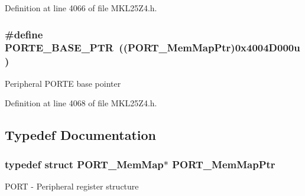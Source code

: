 Definition at line 4066 of file M\+K\+L25\+Z4.\+h.

\subsubsection[{\texorpdfstring{P\+O\+R\+T\+E\+\_\+\+B\+A\+S\+E\+\_\+\+P\+TR}{PORTE_BASE_PTR}}]{\setlength{\rightskip}{0pt plus 5cm}\#define P\+O\+R\+T\+E\+\_\+\+B\+A\+S\+E\+\_\+\+P\+TR~(({\bf P\+O\+R\+T\+\_\+\+Mem\+Map\+Ptr})0x4004\+D000u)}\hypertarget{group___p_o_r_t___peripheral_gab166fe285bbb15b52de610f408fe25d3}{}\label{group___p_o_r_t___peripheral_gab166fe285bbb15b52de610f408fe25d3}
Peripheral P\+O\+R\+TE base pointer 

Definition at line 4068 of file M\+K\+L25\+Z4.\+h.



\subsection{Typedef Documentation}
\subsubsection[{\texorpdfstring{P\+O\+R\+T\+\_\+\+Mem\+Map\+Ptr}{PORT_MemMapPtr}}]{\setlength{\rightskip}{0pt plus 5cm}typedef struct {\bf P\+O\+R\+T\+\_\+\+Mem\+Map}$\ast$ {\bf P\+O\+R\+T\+\_\+\+Mem\+Map\+Ptr}}\hypertarget{group___p_o_r_t___peripheral_ga0e26bafb7c17808f90278627bcbcaf8c}{}\label{group___p_o_r_t___peripheral_ga0e26bafb7c17808f90278627bcbcaf8c}
P\+O\+RT -\/ Peripheral register structure 